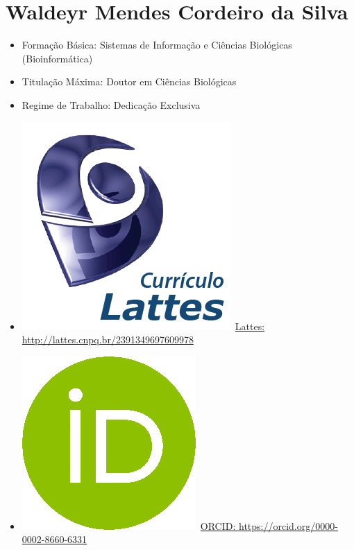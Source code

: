 \documentclass[11pt,fleqn]{book} %
\begin{document}
\section{Waldeyr Mendes Cordeiro da Silva}\label{WaldeyrMendes}
\begin{itemize}
	\item Formação Básica: Sistemas de Informação e Ciências Biológicas (Bioinformática)
	\item Titulação Máxima: Doutor em Ciências Biológicas
	\item Regime de Trabalho: Dedicação Exclusiva
	\item \includegraphics[scale=.03]{Pictures/lattes}~\href{http://lattes.cnpq.br/2391349697609978}{Lattes: http://lattes.cnpq.br/2391349697609978}
	\item \includegraphics[scale=.15]{Pictures/orcid}~\href{https://orcid.org/0000-0002-8660-6331}{ORCID: https://orcid.org/0000-0002-8660-6331}
\end{itemize}
\end{document}
